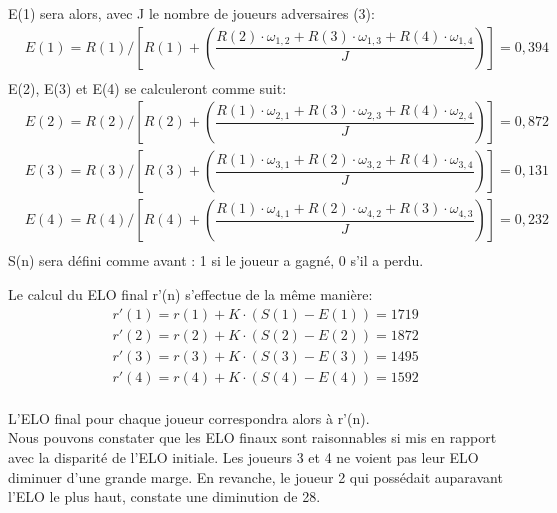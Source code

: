         E(1) sera alors, avec J le nombre de joueurs adversaires (3):
        \begin{equation}
            \begin{split}
                & E(1) = R(1) / [R(1) + (\dfrac{R(2) \cdot \omega_{1, 2} + R(3) \cdot \omega_{1, 3} + R(4) \cdot \omega_{1, 4}}{J})] = 0,394 \\
            \end{split}
        \end{equation}
        E(2), E(3) et E(4) se calculeront comme suit:
        \begin{equation}
            \begin{split}
                & E(2) = R(2) / [R(2) + (\dfrac{R(1) \cdot \omega_{2, 1} + R(3) \cdot \omega_{2, 3} + R(4) \cdot \omega_{2,4} }{J})] = 0,872 \\
                & E(3) = R(3) / [R(3) + (\dfrac{R(1) \cdot \omega_{3, 1} + R(2) \cdot \omega_{3, 2} + R(4) \cdot \omega_{3,4} }{J})] = 0,131 \\
                & E(4) = R(4) / [R(4) + (\dfrac{R(1) \cdot \omega_{4, 1} + R(2) \cdot \omega_{4, 2} + R(3) \cdot \omega_{4,3} }{J})] = 0,232 \\
            \end{split}
        \end{equation}
        S(n) sera défini comme avant : 1 si le joueur a gagné, 0 s'il a perdu.

        Le calcul du ELO final r'(n) s'effectue de la même manière:
        \begin{equation}
            \begin{split}
                & r'(1) = r(1) + K \cdot (S(1) - E(1)) = 1719 \\
                & r'(2) = r(2) + K \cdot (S(2) - E(2)) = 1872 \\
                & r'(3) = r(3) + K \cdot (S(3) - E(3)) = 1495 \\
                & r'(4) = r(4) + K \cdot (S(4) - E(4)) = 1592 \\
            \end{split}
        \end{equation}

        L'ELO final pour chaque joueur correspondra alors à r'(n). \\
        Nous pouvons constater que les ELO finaux sont raisonnables si mis en rapport avec la disparité de l'ELO initiale. Les joueurs 3 et
        4 ne voient pas leur ELO diminuer d'une grande marge. En revanche, le joueur 2 qui possédait auparavant l'ELO le plus haut, constate une diminution de 28.
